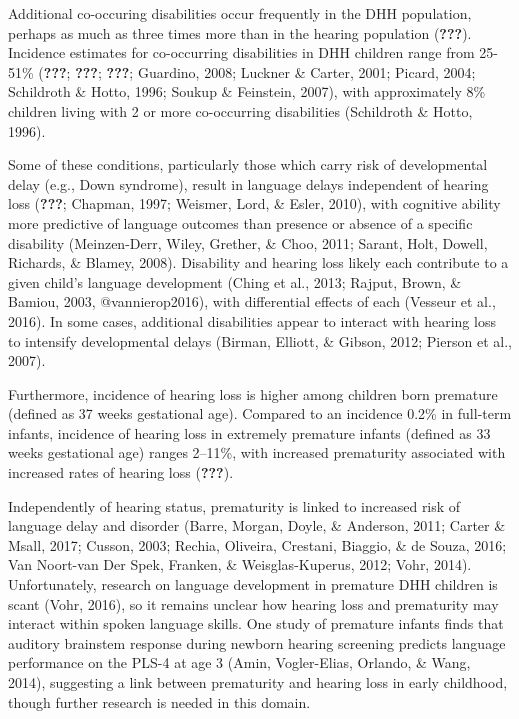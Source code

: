 \documentclass[english,man,floatsintext]{apa6}
\begin{document}
Additional co-occuring disabilities occur frequently in the DHH population, perhaps as much as three times more than in the hearing population ({\textbf{???}}). Incidence estimates for co-occurring disabilities in DHH children range from 25-51\% ({\textbf{???}}; {\textbf{???}}; {\textbf{???}}; Guardino, 2008; Luckner \& Carter, 2001; Picard, 2004; Schildroth \& Hotto, 1996; Soukup \& Feinstein, 2007), with approximately 8\% children living with 2 or more co-occurring disabilities (Schildroth \& Hotto, 1996).

Some of these conditions, particularly those which carry risk of developmental delay (e.g., Down syndrome), result in language delays independent of hearing loss ({\textbf{???}}; Chapman, 1997; Weismer, Lord, \& Esler, 2010), with cognitive ability more predictive of language outcomes than presence or absence of a specific disability (Meinzen-Derr, Wiley, Grether, \& Choo, 2011; Sarant, Holt, Dowell, Richards, \& Blamey, 2008). Disability and hearing loss likely each contribute to a given child's language development (Ching et al., 2013; Rajput, Brown, \& Bamiou, 2003, @vannierop2016), with differential effects of each (Vesseur et al., 2016). In some cases, additional disabilities appear to interact with hearing loss to intensify developmental delays (Birman, Elliott, \& Gibson, 2012; Pierson et al., 2007).

Furthermore, incidence of hearing loss is higher among children born premature (defined as 37 weeks gestational age). Compared to an incidence 0.2\% in full-term infants, incidence of hearing loss in extremely premature infants (defined as 33 weeks gestational age) ranges 2--11\%, with increased prematurity associated with increased rates of hearing loss ({\textbf{???}}).

Independently of hearing status, prematurity is linked to increased risk of language delay and disorder (Barre, Morgan, Doyle, \& Anderson, 2011; Carter \& Msall, 2017; Cusson, 2003; Rechia, Oliveira, Crestani, Biaggio, \& de Souza, 2016; Van Noort-van Der Spek, Franken, \& Weisglas-Kuperus, 2012; Vohr, 2014). Unfortunately, research on language development in premature DHH children is scant (Vohr, 2016), so it remains unclear how hearing loss and prematurity may interact within spoken language skills. One study of premature infants finds that auditory brainstem response during newborn hearing screening predicts language performance on the PLS-4 at age 3 (Amin, Vogler-Elias, Orlando, \& Wang, 2014), suggesting a link between prematurity and hearing loss in early childhood, though further research is needed in this domain.
\end{document}
